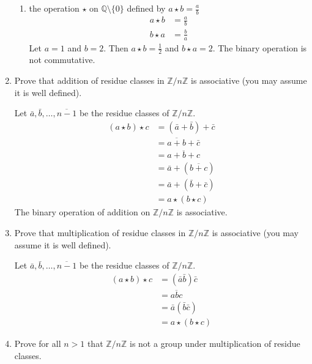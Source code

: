 \begin{enumerate}
\begin{enumerate}[label = (\alph*)]
  \item
    the operation \(\star\) on \(\mathbb{Q}\setminus\{0\}\) defined by
    \(a\star b = \frac{a}{b}\)
    \begin{align*}
      a\star b & = \frac{a}{b}\\
      b\star a & = \frac{b}{a}
    \end{align*}
    Let \(a = 1\) and \(b = 2\).
    Then \(a\star b = \frac{1}{2}\) and \(b\star a = 2\).
    The binary operation is not commutative.
  \end{enumerate}
\item
  Prove that addition of residue classes in \(\mathbb{Z}/n\mathbb{Z}\) is
  associative (you may assume it is well defined).
  \par\smallskip
  Let \(\bar{a}, \bar{b}, \ldots, \overline{n - 1}\) be the residue classes of
  \(\mathbb{Z}/n\mathbb{Z}\).
  \begin{align*}
    (a\star b)\star c & = (\bar{a} + \bar{b}) + \bar{c}\\
                      & = \overline{a + b} + \bar{c}\\
                      & = \overline{a + b + c}\\
                      & = \bar{a} + (\overline{b + c})\\
                      & = \bar{a} + (\bar{b} + \bar{c})\\
                      & = a\star (b\star c)
  \end{align*}
  The binary operation of addition on \(\mathbb{Z}/n\mathbb{Z}\) is
  associative.
\item
  Prove that multiplication of residue classes in \(\mathbb{Z}/n\mathbb{Z}\) is
  associative (you may assume it is well defined).
  \par\smallskip
  Let \(\bar{a}, \bar{b}, \ldots, \overline{n - 1}\) be the residue classes of
  \(\mathbb{Z}/n\mathbb{Z}\).
  \begin{align*}
    (a\star b)\star c & = (\bar{a}\bar{b})\bar{c}\\
                      & = \overline{abc}\\
                      & = \bar{a}(\bar{b}\bar{c})\\
                      & = a\star (b\star c)
  \end{align*}
\item
  Prove for all \(n > 1\) that \(\mathbb{Z}/n\mathbb{Z}\) is not a group under
  multiplication of residue classes.
  \par\smallskip

\end{enumerate}
